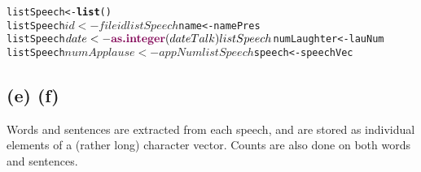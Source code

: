 \documentclass{article}\usepackage{graphicx, color}
\makeatletter
\newcommand{\hlfunctioncall}[1]{\textcolor[rgb]{0.501960784313725,0,0.329411764705882}{\textbf{#1}}}%
\newenvironment{kframe}{%
 \def\at@end@of@kframe{}%
 \ifinner\ifhmode%
  \def\at@end@of@kframe{\end{minipage}}%
  \begin{minipage}{\columnwidth}%
 \fi\fi%
 \def\FrameCommand##1{\hskip\@totalleftmargin \hskip-\fboxsep
 \colorbox{shadecolor}{##1}\hskip-\fboxsep
     \hskip-\linewidth \hskip-\@totalleftmargin \hskip\columnwidth}%
 \MakeFramed {\advance\hsize-\width
   \@totalleftmargin\z@ \linewidth\hsize
   \@setminipage}}%
 {\par\unskip\endMakeFramed%
 \at@end@of@kframe}
\newenvironment{knitrout}{}{} %
\makeatother
\begin{document}
\begin{knitrout}
\color{fgcolor}\begin{kframe}
\begin{alltt}
listSpeech <- \hlfunctioncall{list}()
listSpeech$id <- fileid
listSpeech$name <- namePres
listSpeech$date <- \hlfunctioncall{as.integer}(dateTalk)
listSpeech$numLaughter <- lauNum
listSpeech$numApplause <- appNum
listSpeech$speech <- speechVec
\end{alltt}
\end{kframe}
\end{knitrout}



\subsection*{(e) (f)}

Words and sentences are extracted from each speech, and are stored as individual elements of a (rather long)
character vector. Counts are also done on both words and sentences.
\end{document}

